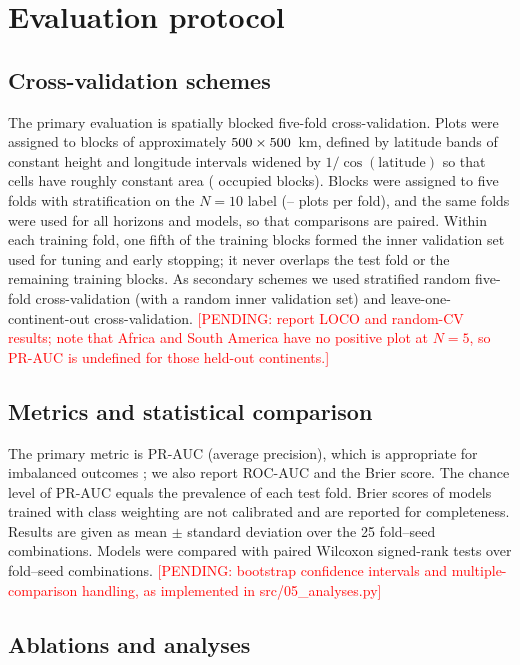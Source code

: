 \documentclass[a4paper,fleqn]{cas-sc}
\newcommand{\pending}[1]{\textcolor{red}{[PENDING: #1]}}
\begin{document}
\section{Evaluation protocol}
\label{sec:protocol}

\subsection{Cross-validation schemes}

The primary evaluation is spatially blocked five-fold cross-validation. Plots were assigned to blocks of approximately $500 \times 500$~km, defined by latitude bands of constant height and longitude intervals widened by $1/\cos(\text{latitude})$ so that cells have roughly constant area (\nBlocks{} occupied blocks). Blocks were assigned to five folds with stratification on the $N = 10$ label (\foldSizeMin--\foldSizeMax{} plots per fold), and the same folds were used for all horizons and models, so that comparisons are paired. Within each training fold, one fifth of the training blocks formed the inner validation set used for tuning and early stopping; it never overlaps the test fold or the remaining training blocks. As secondary schemes we used stratified random five-fold cross-validation (with a random inner validation set) and leave-one-continent-out cross-validation. \pending{report LOCO and random-CV results; note that Africa and South America have no positive plot at $N=5$, so PR-AUC is undefined for those held-out continents.}

\subsection{Metrics and statistical comparison}

The primary metric is PR-AUC (average precision), which is appropriate for imbalanced outcomes \citep{saito2015}; we also report ROC-AUC and the Brier score. The chance level of PR-AUC equals the prevalence of each test fold. Brier scores of models trained with class weighting are not calibrated and are reported for completeness. Results are given as mean $\pm$ standard deviation over the 25 fold--seed combinations. Models were compared with paired Wilcoxon signed-rank tests \citep{wilcoxon1945} over fold--seed combinations. \pending{bootstrap confidence intervals and multiple-comparison handling, as implemented in src/05\_analyses.py}

\subsection{Ablations and analyses}
\end{document}
